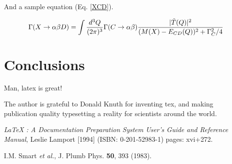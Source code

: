 \documentclass[aps,floatfix,prd,showpacs]{revtex4}
\begin{document}
And a sample equation (Eq. \ref{XCD}).

\begin{equation}
\Gamma(X \to \alpha\beta D) = \int {d^3Q\over (2\pi)^3}  \Gamma(C\to \alpha\beta) {|\tilde T(Q)|^2 \over
(M(X) - E_{CD}(Q))^2 + \Gamma_C^2/4}
\label{XCD}
\end{equation}





\section{Conclusions}

Man, latex is great!

\acknowledgments
The author is grateful to Donald Knuth for inventing tex, and making publication quality typesetting a reality for scientists around the world.


\begin{thebibliography}{99}

 {\sl LaTeX : A Documentation Preparation System User's Guide and Reference Manual}, Leslie Lamport [1994] (ISBN: 0-201-52983-1) pages: xvi+272.

I.M. Smart {\it et al.}, J. Plumb Phys. {\bf 50}, 393 (1983).

\end{thebibliography}
\end{document}
